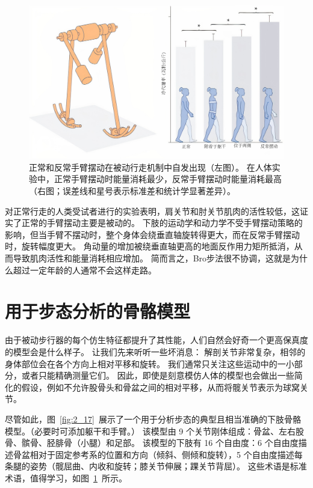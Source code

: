 \begin{figure}[!htb]
	\centering
	\includegraphics[width=1.0\linewidth]{chap2/2_16}
	\caption{正常和反常手臂摆动在被动行走机制中自发出现（左图）。
		在人体实验中，正常手臂摆动时能量消耗最少，反常手臂摆动时能量消耗最高（右图；误差线和星号表示标准差和统计学显著差异）\cite{collins2009dynamic}。 \label{fig:2_16}}
\end{figure}


对正常行走的人类受试者进行的实验表明，肩关节和肘关节肌肉的活性较低，这证实了正常的手臂摆动主要是被动的。
下肢的运动学和动力学不受手臂摆动策略的影响，但当手臂不摆动时，整个身体会绕垂直轴旋转得更大，而在反常手臂摆动时，旋转幅度更大。
角动量的增加被绕垂直轴更高的地面反作用力矩所抵消，从而导致肌肉活性和能量消耗相应增加。
简而言之，Bro步法很不协调，这就是为什么超过一定年龄的人通常不会这样走路。


\section{用于步态分析的骨骼模型}

由于被动步行器的每个仿生特征都提升了其性能，人们自然会好奇一个更高保真度的模型会是什么样子。
让我们先来听听一些坏消息：
解剖关节非常复杂，相邻的身体部位会在各个方向上相对平移和旋转。
我们通常只关注这些运动中的一小部分，或者只能精确测量它们。
因此，即使是刻意模仿人体的模型也会做出一些简化的假设，例如不允许股骨头和骨盆之间的相对平移，从而将髋关节表示为球窝关节。


尽管如此，图~\ref{fig:2_17}~展示了一个用于分析步态的典型且相当准确的下肢骨骼模型。（必要时可添加躯干和手臂。）
该模型由 9 个关节刚体组成：骨盆、左右股骨、髌骨、胫腓骨（小腿）和足部。
该模型的下肢有 16 个自由度：6 个自由度描述骨盆相对于固定参考系的位置和方向（倾斜、侧倾和旋转），5 个自由度描述每条腿的姿势（髋屈曲、内收和旋转；膝关节伸展；踝关节背屈）。
这些术语是标准术语，值得学习，如图~\ref{fig:2_16}~所示。

